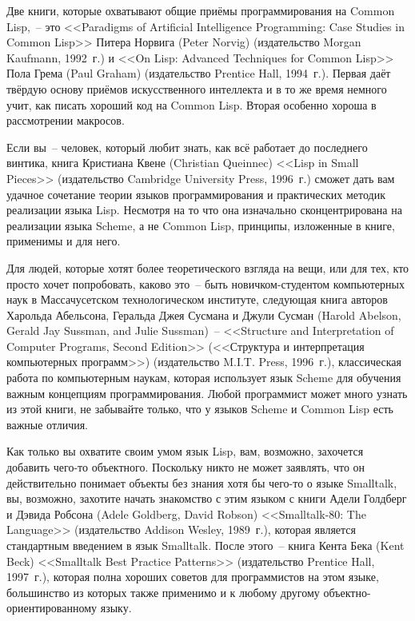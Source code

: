 Две книги, которые охватывают общие приёмы программирования на Common Lisp,~-- это
<<Paradigms of Artificial Intelligence Programming: Case Studies in Common Lisp>> Питера
Норвига (Peter Norvig) (издательство Morgan Kaufmann, 1992~г.) и <<On Lisp: Advanced
Techniques for Common Lisp>> Пола Грема (Paul Graham) (издательство Prentice Hall,
1994~г.). Первая даёт твёрдую основу приёмов искусственного интеллекта и в то же время
немного учит, как писать хороший код на Common Lisp. Вторая особенно хороша в рассмотрении
макросов.

Если вы~-- человек, который любит знать, как всё работает до последнего винтика, книга
Кристиана Квене (Christian Queinnec) <<Lisp in Small Pieces>> (издательство Cambridge
University Press, 1996~г.) сможет дать вам удачное сочетание теории языков программирования
и практических методик реализации языка Lisp. Несмотря на то что она изначально
сконцентрирована на реализации языка Scheme, а не Common Lisp, принципы, изложенные в
книге, применимы и для него.

Для людей, которые хотят более теоретического взгляда на вещи, или для тех, кто просто
хочет попробовать, каково это~-- быть новичком-студентом компьютерных наук в
Массачусетском технологическом институте, следующая книга авторов Харольда Абельсона,
Геральда Джея Сусмана и Джули Сусман (Harold Abelson, Gerald Jay Sussman, and Julie
Sussman)~-- <<Structure and Interpretation of Computer Programs, Second Edition>>
(<<Структура и интерпретация компьютерных программ>>) (издательство M.I.T. Press, 1996~г.),
классическая работа по компьютерным наукам, которая использует язык Scheme для обучения
важным концепциям программирования. Любой программист может много узнать из этой книги, не
забывайте только, что у языков Scheme и Common Lisp есть важные отличия.

Как только вы охватите своим умом язык Lisp, вам, возможно, захочется добавить чего-то
объектного. Поскольку никто не может заявлять, что он действительно понимает объекты без
знания хотя бы чего-то о языке Smalltalk, вы, возможно, захотите начать знакомство с этим
языком с книги Адели Голдберг и Дэвида Робсона (Adele Goldberg, David Robson)
<<Smalltalk-80: The Language>> (издательство Addison Wesley, 1989~г.), которая является
стандартным введением в язык Smalltalk. После этого~-- книга Кента Бека (Kent Beck)
<<Smalltalk Best Practice Patterns>> (издательство Prentice Hall, 1997~г.), которая полна
хороших советов для программистов на этом языке, большинство из которых также применимо и
к любому другому объектно-ориентированному языку.

